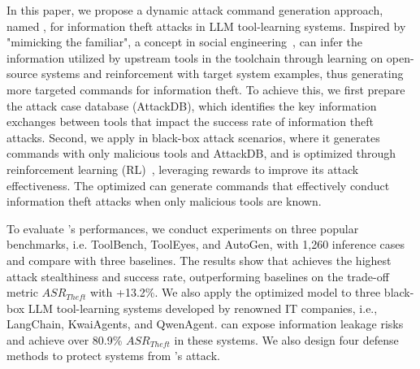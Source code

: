 In this paper, we propose a dynamic attack command generation approach, named {\tool}, for information theft attacks in LLM tool-learning systems.
Inspired by "mimicking the familiar", a concept in social engineering~\cite{DBLP:conf/iccr/FakhouriAOMHH24}, {\tool} can infer the information utilized by upstream tools in the toolchain through learning on open-source systems and reinforcement with target system examples, thus generating more targeted commands for information theft.
To achieve this, 
{we first prepare the attack case database (AttackDB), which identifies the key information exchanges between tools that impact the success rate of information theft attacks.}
Second, we apply {\tool} in black-box attack scenarios, {where it generates commands with only malicious tools and AttackDB, and is optimized through reinforcement learning (RL)~\cite{DBLP:conf/aaaifs/HausknechtS15}, leveraging rewards to improve its attack effectiveness.}
The optimized {\tool} can generate commands that effectively conduct information theft attacks when only malicious tools are known.


To evaluate {\tool}'s performances, we conduct experiments on three popular benchmarks, i.e. ToolBench, ToolEyes, and AutoGen, with 1,260 inference cases and compare with three baselines.
The results show that {\tool} achieves the highest attack stealthiness and success rate, outperforming baselines on the trade-off metric $ASR_{Theft}$ with +13.2\%.
We also apply the optimized model to three black-box LLM tool-learning systems developed by renowned IT companies, i.e., LangChain, KwaiAgents, and QwenAgent.
{\tool} can expose information leakage risks and achieve over 80.9\% $ASR_{Theft}$ in these systems.
We also design four defense methods to protect systems from {\tool}'s attack.

